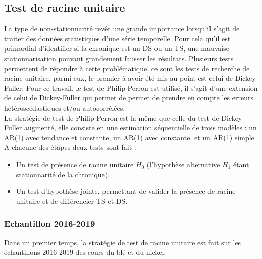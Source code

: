 \subsection{Test de racine unitaire}
La type de non-stationnarité revêt une grande importance lorsqu'il s'agit de traiter des données statistiques d'une série temporelle. Pour cela qu'il est
primordial d'identifier si la chronique est un DS ou un TS, une mauvaise stationnarisation pouvant grandement fausser les résultats. Plusieurs tests permettent de
répondre à cette problématique, ce sont les tests de recherche de racine unitaire, parmi eux, le premier à avoir été mis au point est celui de Dickey-Fuller. Pour ce
travail, le test de Philip-Perron est utilisé, il s'agit d'une extension de celui de Dickey-Fuller qui permet de permet de prendre en compte les erreurs hétéroscédastiques 
et/ou autocorrélées.\\[11pt]
La stratégie de test de Philip-Perron est la même que celle du test de Dickey-Fuller augmenté, elle consiste en une estimation séquentielle de trois modèles : un AR(1) avec tendance et constante, un AR(1) avec constante, et un AR(1) simple. A chacune des étapes deux tests sont fait :
\begin{itemize}
    \item Un test de présence de racine unitaire $H_{0}$ (l'hypothèse alternative $H_{1}$ étant stationnarité de la chronique).
    \item Un test d'hypothèse jointe, permettant de valider la présence de racine unitaire et de différencier TS et DS. 
\end{itemize}
%
\subsubsection{Echantillon 2016-2019}
Dans un premier temps, la stratégie de test de racine unitaire est fait sur les échantillons 2016-2019 des cours du blé et du nickel.
